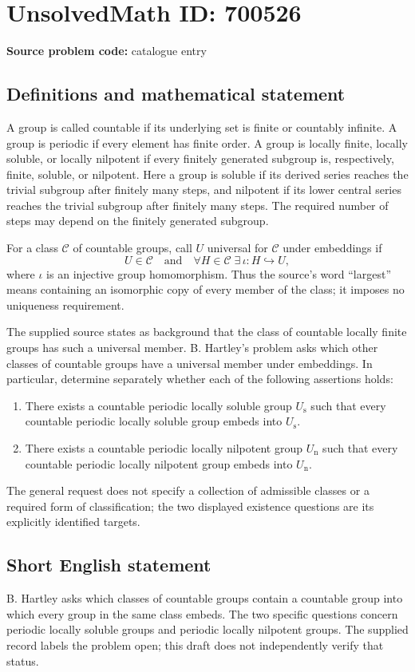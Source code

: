 \documentclass[11pt]{article}
\begin{document}
\section*{UnsolvedMath ID: 700526}
\textbf{Source problem code:} catalogue entry
\subsection{Definitions and mathematical statement}
A group is called countable if its underlying set is finite or countably infinite. A group is periodic if every element has finite order. A group is locally finite, locally soluble, or locally nilpotent if every finitely generated subgroup is, respectively, finite, soluble, or nilpotent. Here a group is soluble if its derived series reaches the trivial subgroup after finitely many steps, and nilpotent if its lower central series reaches the trivial subgroup after finitely many steps. The required number of steps may depend on the finitely generated subgroup.

For a class \(\mathcal C\) of countable groups, call \(U\) universal for \(\mathcal C\) under embeddings if
\[
U\in\mathcal C
\quad\text{and}\quad
\forall H\in\mathcal C\;\exists\,\iota:H\hookrightarrow U,
\]
where \(\iota\) is an injective group homomorphism. Thus the source's word ``largest'' means containing an isomorphic copy of every member of the class; it imposes no uniqueness requirement.

The supplied source states as background that the class of countable locally finite groups has such a universal member. B. Hartley's problem asks which other classes of countable groups have a universal member under embeddings. In particular, determine separately whether each of the following assertions holds:
\begin{enumerate}
\item There exists a countable periodic locally soluble group \(U_{\mathrm s}\) such that every countable periodic locally soluble group embeds into \(U_{\mathrm s}\).
\item There exists a countable periodic locally nilpotent group \(U_{\mathrm n}\) such that every countable periodic locally nilpotent group embeds into \(U_{\mathrm n}\).
\end{enumerate}
The general request does not specify a collection of admissible classes or a required form of classification; the two displayed existence questions are its explicitly identified targets.
\subsection{Short English statement}
B. Hartley asks which classes of countable groups contain a countable group into which every group in the same class embeds. The two specific questions concern periodic locally soluble groups and periodic locally nilpotent groups. The supplied record labels the problem open; this draft does not independently verify that status.
\end{document}

